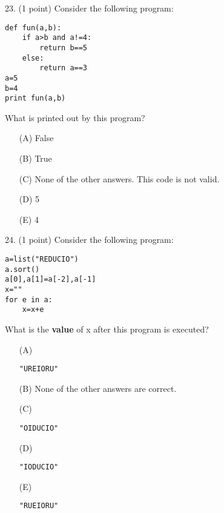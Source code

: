 \documentclass{article}
\begin{document}
\noindent
\begin{minipage}{\textwidth}
23. (1 point)
Consider the following program:
\begin{verbatim}
def fun(a,b):
    if a>b and a!=4:
        return b==5
    else:
        return a==3
a=5
b=4
print fun(a,b)
\end{verbatim}
What is printed out by this program?

\begin{enumerate}
\item[(A)]
False

\item[(B)]
True

\item[(C)]
None of the other answers. This code is not valid.

\item[(D)]
5

\item[(E)]
4

\end{enumerate}
\end{minipage}
\vspace{10em}
\filbreak\vfil{}\vfilneg

\noindent
\begin{minipage}{\textwidth}
24. (1 point)
Consider the following program:
\begin{verbatim}
a=list("REDUCIO")
a.sort()
a[0],a[1]=a[-2],a[-1]
x=""
for e in a:
    x=x+e
\end{verbatim}
What is the \textbf{value} of x after this program is executed?

\begin{enumerate}
\item[(A)]
\begin{verbatim}"UREIORU"\end{verbatim}

\item[(B)]
None of the other answers are correct.

\item[(C)]
\begin{verbatim}"OIDUCIO"\end{verbatim}

\item[(D)]
\begin{verbatim}"IODUCIO"\end{verbatim}

\item[(E)]
\begin{verbatim}"RUEIORU"\end{verbatim}

\end{enumerate}
\end{minipage}
\vspace{10em}
\filbreak\vfil{}\vfilneg
\end{document}
